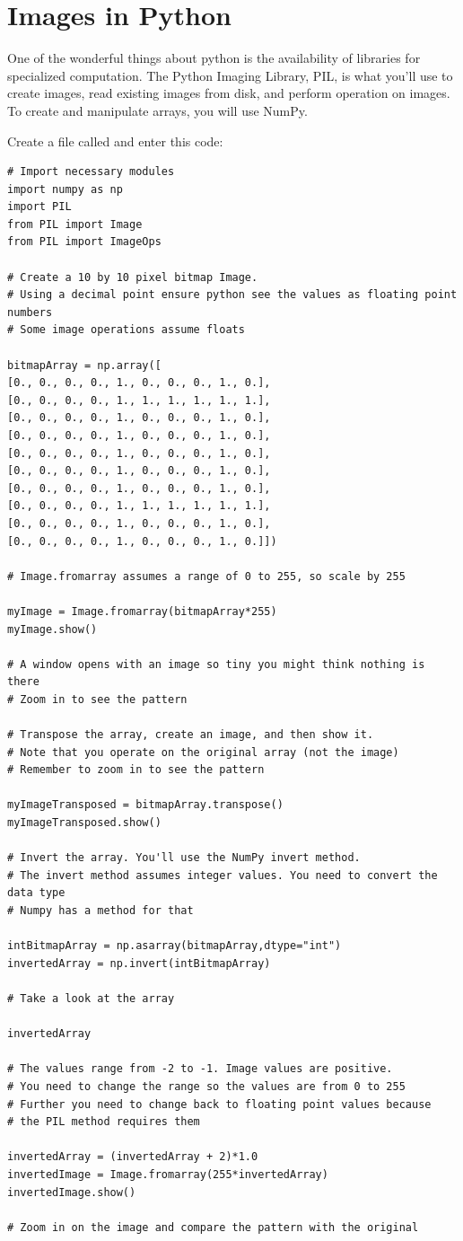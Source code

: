 \section{Images in Python}
One of the wonderful things about python is the availability of libraries for 
specialized computation. The Python Imaging Library, PIL, is what you'll use 
to create images, read existing images from disk, and perform operation on 
images. To create and manipulate arrays, you will use NumPy. 

Create a file called  and enter this code:

\begin{Verbatim}
# Import necessary modules
import numpy as np
import PIL
from PIL import Image
from PIL import ImageOps

# Create a 10 by 10 pixel bitmap Image. 
# Using a decimal point ensure python see the values as floating point numbers
# Some image operations assume floats

bitmapArray = np.array([
[0., 0., 0., 0., 1., 0., 0., 0., 1., 0.],
[0., 0., 0., 0., 1., 1., 1., 1., 1., 1.],
[0., 0., 0., 0., 1., 0., 0., 0., 1., 0.],
[0., 0., 0., 0., 1., 0., 0., 0., 1., 0.],
[0., 0., 0., 0., 1., 0., 0., 0., 1., 0.],
[0., 0., 0., 0., 1., 0., 0., 0., 1., 0.],
[0., 0., 0., 0., 1., 0., 0., 0., 1., 0.],
[0., 0., 0., 0., 1., 1., 1., 1., 1., 1.],
[0., 0., 0., 0., 1., 0., 0., 0., 1., 0.],
[0., 0., 0., 0., 1., 0., 0., 0., 1., 0.]])

# Image.fromarray assumes a range of 0 to 255, so scale by 255

myImage = Image.fromarray(bitmapArray*255)
myImage.show()

# A window opens with an image so tiny you might think nothing is there
# Zoom in to see the pattern  

# Transpose the array, create an image, and then show it. 
# Note that you operate on the original array (not the image)
# Remember to zoom in to see the pattern 

myImageTransposed = bitmapArray.transpose()
myImageTransposed.show()

# Invert the array. You'll use the NumPy invert method.
# The invert method assumes integer values. You need to convert the data type
# Numpy has a method for that

intBitmapArray = np.asarray(bitmapArray,dtype="int")
invertedArray = np.invert(intBitmapArray)

# Take a look at the array

invertedArray

# The values range from -2 to -1. Image values are positive.
# You need to change the range so the values are from 0 to 255
# Further you need to change back to floating point values because
# the PIL method requires them

invertedArray = (invertedArray + 2)*1.0
invertedImage = Image.fromarray(255*invertedArray)
invertedImage.show()

# Zoom in on the image and compare the pattern with the original

\end{Verbatim}

